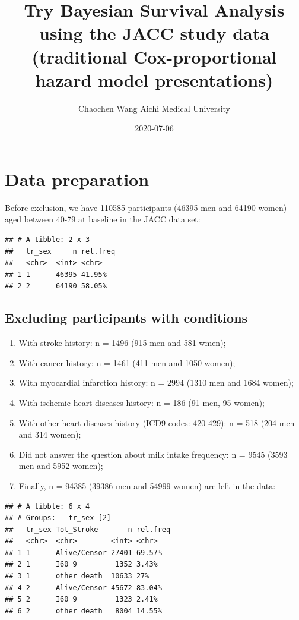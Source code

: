 \documentclass[]{tufte-handout}
\title{Try Bayesian Survival Analysis using the JACC study data
(traditional Cox-proportional hazard model presentations)}
\author{Chaochen Wang \textbar{} Aichi Medical University}
\date{2020-07-06}
\providecommand{\tightlist}{%
  \setlength{\itemsep}{0pt}\setlength{\parskip}{0pt}}
\begin{document}
\maketitle




\hypertarget{data-preparation}{%
\section{Data preparation}\label{data-preparation}}

Before exclusion, we have 110585 participants (46395 men and 64190
women) aged between 40-79 at baseline in the JACC data set:

\begin{verbatim}
## # A tibble: 2 x 3
##   tr_sex     n rel.freq
##   <chr>  <int> <chr>   
## 1 1      46395 41.95%  
## 2 2      64190 58.05%
\end{verbatim}

\hypertarget{excluding-participants-with-conditions}{%
\subsection{Excluding participants with
conditions}\label{excluding-participants-with-conditions}}

\begin{enumerate}
\def\labelenumi{\arabic{enumi}.}
\tightlist
\item
  With stroke history: n = 1496 (915 men and 581 wmen);
\item
  With cancer history: n = 1461 (411 men and 1050 women);
\item
  With myocardial infarction history: n = 2994 (1310 men and 1684
  women);
\item
  With ischemic heart diseases history: n = 186 (91 men, 95 women);
\item
  With other heart diseases history (ICD9 codes: 420-429): n = 518 (204
  men and 314 women);
\item
  Did not answer the question about milk intake frequency: n = 9545
  (3593 men and 5952 women);
\item
  Finally, n = 94385 (39386 men and 54999 women) are left in the data:
\end{enumerate}

\begin{verbatim}
## # A tibble: 6 x 4
## # Groups:   tr_sex [2]
##   tr_sex Tot_Stroke       n rel.freq
##   <chr>  <chr>        <int> <chr>   
## 1 1      Alive/Censor 27401 69.57%  
## 2 1      I60_9         1352 3.43%   
## 3 1      other_death  10633 27%     
## 4 2      Alive/Censor 45672 83.04%  
## 5 2      I60_9         1323 2.41%   
## 6 2      other_death   8004 14.55%
\end{verbatim}
\end{document}

